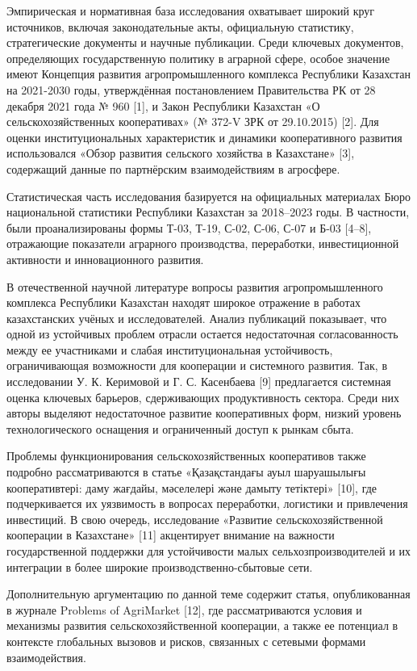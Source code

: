 \begin{multicols}{2}
Эмпирическая и нормативная база исследования охватывает широкий круг
источников, включая законодательные акты, официальную статистику,
стратегические документы и научные публикации. Среди ключевых
документов, определяющих государственную политику в аграрной сфере,
особое значение имеют Концепция развития агропромышленного комплекса
Республики Казахстан на 2021-2030 годы, утверждённая постановлением
Правительства РК от 28 декабря 2021 года № 960 {[}1{]}, и Закон
Республики Казахстан «О сельскохозяйственных кооперативах» (№ 372-V ЗРК
от 29.10.2015) {[}2{]}. Для оценки институциональных характеристик и
динамики кооперативного развития использовался «Обзор развития сельского
хозяйства в Казахстане» {[}3{]}, содержащий данные по партнёрским
взаимодействиям в агросфере.

Статистическая часть исследования базируется на официальных материалах
Бюро национальной статистики Республики Казахстан за 2018--2023 годы. В
частности, были проанализированы формы Т-03, Т-19, С-02, С-06, С-07 и
Б-03 {[}4--8{]}, отражающие показатели аграрного производства,
переработки, инвестиционной активности и инновационного развития.

В отечественной научной литературе вопросы развития агропромышленного
комплекса Республики Казахстан находят широкое отражение в работах
казахстанских учёных и исследователей. Анализ публикаций показывает, что
одной из устойчивых проблем отрасли остается недостаточная
согласованность между ее участниками и слабая институциональная
устойчивость, ограничивающая возможности для кооперации и системного
развития. Так, в исследовании У. К. Керимовой и Г. С. Касенбаева {[}9{]}
предлагается системная оценка ключевых барьеров, сдерживающих
продуктивность сектора. Среди них авторы выделяют недостаточное развитие
кооперативных форм, низкий уровень технологического оснащения и
ограниченный доступ к рынкам сбыта.

Проблемы функционирования сельскохозяйственных кооперативов также
подробно рассматриваются в статье «Қазақстандағы ауыл шаруашылығы
кооперативтері: даму жағдайы, мәселелері және дамыту тетіктері»
{[}10{]}, где подчеркивается их уязвимость в вопросах переработки,
логистики и привлечения инвестиций. В свою очередь, исследование
«Развитие сельскохозяйственной кооперации в Казахстане» {[}11{]}
акцентирует внимание на важности государственной поддержки для
устойчивости малых сельхозпроизводителей и их интеграции в более широкие
производственно-сбытовые сети.

Дополнительную аргументацию по данной теме содержит статья,
опубликованная в журнале Problems of AgriMarket {[}12{]}, где
рассматриваются условия и механизмы развития сельскохозяйственной
кооперации, а также ее потенциал в контексте глобальных вызовов и
рисков, связанных с сетевыми формами взаимодействия.


\end{multicols}
